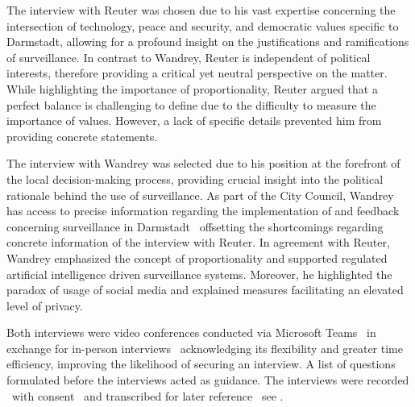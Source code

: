 \documentclass[12pt]{article}
\begin{document}
	The interview with Reuter was chosen due to his vast expertise concerning the intersection of technology, peace and security, and democratic values specific to Darmstadt, allowing for a profound insight on the justifications and ramifications of surveillance. In contrast to Wandrey, Reuter is independent of political interests, therefore providing a critical yet neutral perspective on the matter. While highlighting the importance of proportionality, Reuter argued that a perfect balance is challenging to define due to the difficulty to measure the importance of values. However, a lack of specific details prevented him from providing concrete statements.
	
	The interview with Wandrey was selected due to his position at the forefront of the local decision-making process, providing crucial insight into the political rationale behind the use of surveillance. As part of the City Council, Wandrey has access to precise information regarding the implementation of and feedback concerning surveillance in Darmstadt \textemdash\ offsetting the shortcomings regarding concrete information of the interview with Reuter. In agreement with Reuter, Wandrey emphasized the concept of proportionality and supported regulated artificial intelligence driven surveillance systems. Moreover, he highlighted the paradox of usage of social media and explained measures facilitating an elevated level of privacy.
	
	Both interviews were video conferences conducted via Microsoft Teams \textemdash\ in exchange for in-person interviews \textemdash\ acknowledging its flexibility and greater time efficiency, improving the likelihood of securing an interview. A list of questions formulated before the interviews acted as guidance. The interviews were recorded \textemdash\ with consent \textemdash\ and transcribed for later reference \textemdash\ see . 
	
\end{document}
